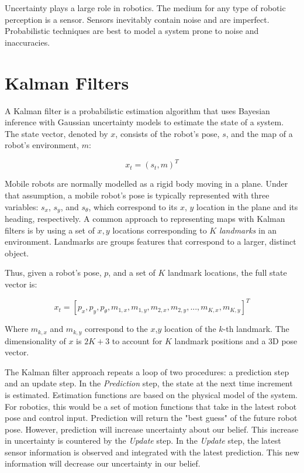 \documentclass[10pt,conference]{ieeeconf}
\begin{document}
	Uncertainty plays a large role in robotics. The medium for any type of robotic perception is a sensor. Sensors inevitably contain noise and are imperfect. Probabilistic techniques are best to model a system prone to noise and inaccuracies.

\section {Kalman Filters}
    
    A Kalman filter is a probabilistic estimation algorithm that uses Bayesian inference with Gaussian uncertainty models to estimate the state of a system. The state vector, denoted by $x$, consists of the robot's pose, $s$, and the map of a robot's environment, $m$:
    
    \begin{equation}
    x_t = (s_t, m)^T
    \end{equation}
    
    Mobile robots are normally modelled as a rigid body moving in a plane. Under that assumption, a mobile robot's pose is typically represented with three variables: $s_x$, $s_y$, and $s_\theta$, which correspond to its $x$, $y$ location in the plane and its heading, respectively. A common approach to representing maps with Kalman filters is by using a set of $x,y$ locations corresponding to $K$ \emph{landmarks} in an environment. Landmarks are groups features that correspond to a larger, distinct object.
    
    Thus, given a robot's pose, $p$, and a set of $K$ landmark locations, the full state vector is:
    
    \begin{equation}
    	x_t = [p_x, p_y, p_\theta, m_{1,x}, m_{1,y}, m_{2,x}, m_{2,y}, ... , m_{K,x}, m_{K,y}]^T
	\end{equation}
    
    Where $m_{k,x}$ and $m_{k,y}$ correspond to the $x$,$y$ location of the $k$-th landmark. The dimensionality of $x$ is $2K+3$ to account for $K$ landmark positions and a 3D pose vector.
            
    The Kalman filter approach repeats a loop of two procedures: a prediction step and an update step. In the \emph{Prediction} step, the state at the next time increment is estimated. Estimation functions are based on the physical model of the system. For robotics, this would be a set of motion functions that take in the latest robot pose and control input. Prediction will return the "best guess" of the future robot pose. However, prediction will increase uncertainty about our belief. This increase in uncertainty is countered by the \emph{Update} step. In the \emph{Update} step, the latest sensor information is observed and integrated with the latest prediction. This new information will decrease our uncertainty in our belief.
    
\end{document}
